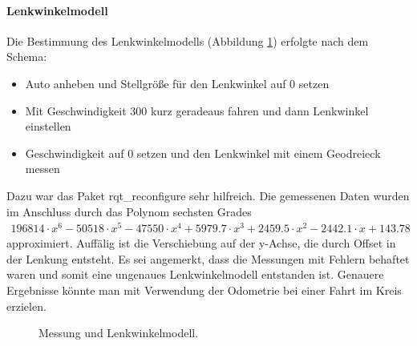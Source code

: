 \paragraph{Lenkwinkelmodell}
Die Bestimmung des Lenkwinkelmodells (Abbildung \ref{fig:Lenkwinkelmodell}) erfolgte nach dem Schema:
\begin{itemize}
	\item Auto anheben und Stellgr\"o\ss{}e f\"ur den Lenkwinkel auf 0 setzen
	\item Mit Geschwindigkeit 300 kurz geradeaus fahren und dann Lenkwinkel einstellen
	\item Geschwindigkeit auf 0 setzen und den Lenkwinkel mit einem Geodreieck messen
\end{itemize}
Dazu war das Paket rqt\_reconfigure sehr hilfreich. Die gemessenen Daten wurden im Anschluss durch das Polynom sechsten Grades
\begin{align*}
196814\cdot x^6 - 50518\cdot x^5 - 47550\cdot x^4 + 5979.7\cdot x^3 + 2459.5\cdot x^2 - 2442.1\cdot x + 143.78
\end{align*} 
approximiert.
Auff\"alig ist die Verschiebung auf der y-Achse, die durch Offset in der Lenkung entsteht. Es sei angemerkt, dass die Messungen mit Fehlern behaftet waren und somit eine ungenaues Lenkwinkelmodell entstanden ist. Genauere Ergebnisse k\"onnte man mit Verwendung der Odometrie bei einer Fahrt im Kreis erzielen.
\begin{figure}[h]
	\centering
	\caption{Messung und Lenkwinkelmodell.}
	\label{fig:Lenkwinkelmodell}
\end{figure}